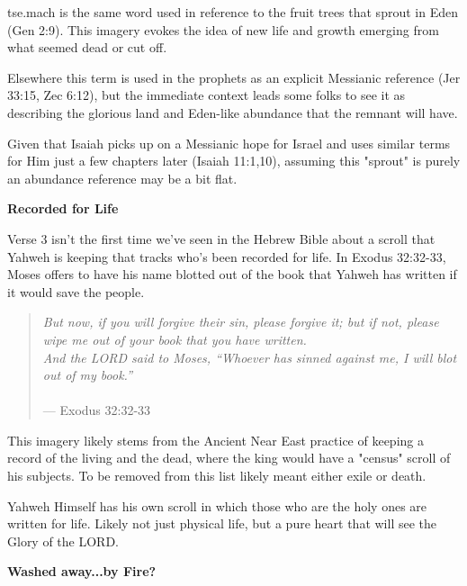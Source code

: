 \documentclass[11pt]{article}
\begin{document}
tse.mach is the same word used in reference to the fruit trees that sprout in Eden (Gen 2:9). This imagery evokes the idea of new life and growth emerging from what seemed dead or cut off.
\vspace{1em}

Elsewhere this term is used in the prophets as an explicit Messianic reference (Jer 33:15, Zec 6:12), but the immediate context leads some folks to see it as describing the glorious land and Eden-like abundance that the remnant will have.
\vspace{1em}

Given that Isaiah picks up on a Messianic hope for Israel and uses similar terms for Him just a few chapters later (Isaiah 11:1,10), assuming this "sprout" is purely an abundance reference may be a bit flat.


\vspace{3em}
{\large\bfseries Recorded for Life}
\vspace{1em}

Verse 3 isn't the first time we've seen in the Hebrew Bible about a scroll that Yahweh is keeping that tracks who's been recorded for life.
In Exodus 32:32-33, Moses offers to have his name blotted out of the book that Yahweh has written if it would save the people.

\begin{quote}
\textit{But now, if you will forgive their sin, please forgive it; but if not, please wipe me out of your book that you have written.
\\And the LORD said to Moses, “Whoever has sinned against me, I will blot out of my book.”}\\\\
\hfill --- Exodus 32:32-33
\end{quote}

{\vspace{1em}}

This imagery likely stems from the Ancient Near East practice of keeping a record of the living and the dead, where the king would have a "census" scroll of his subjects. To be removed from this list likely meant either exile or death.

{\vspace{1em}}

Yahweh Himself has his own scroll in which those who are the holy ones are written for life. Likely not just physical life, but a pure heart that will see the Glory of the LORD.


\vspace{3em}
{\large\bfseries Washed away...by Fire?}
\vspace{1em}
\end{document}
